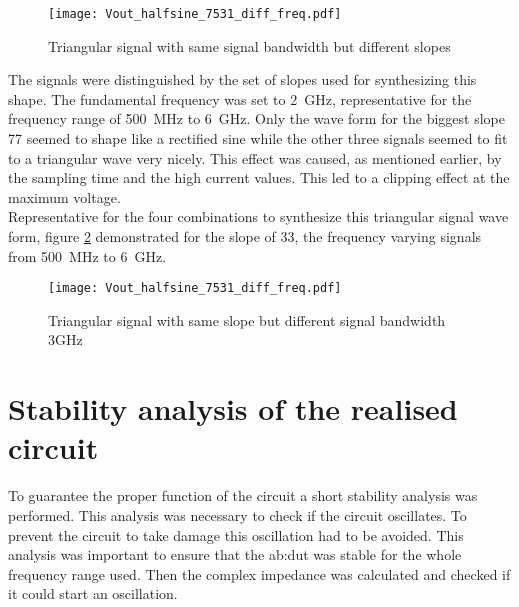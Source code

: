 \begin{figure}[htb!]
	\centering
  \texttt{[image: Vout\_halfsine\_7531\_diff\_freq.pdf]}
	\caption{Triangular signal with same signal bandwidth but different slopes}
	\label{fig:DiffSlopeSameBWTriangular}
\end{figure}

The signals were distinguished by the set of slopes used for synthesizing this shape.
The fundamental frequency was set to \SI{2}{\giga \hertz}, representative for the frequency range of \SI{500}{\mega \hertz} to \SI{6}{\giga \hertz}.
Only the wave form for the biggest slope 77 seemed to shape like a rectified sine while the other three signals seemed to fit to a triangular wave very nicely.
This effect was caused, as mentioned earlier, by the sampling time and the high current values.
This led to a clipping effect at the maximum voltage.\\
Representative for the four combinations to synthesize this triangular signal wave form, 
figure \ref{fig:DiffSigBWSameSlopeTriangular} demonstrated for the slope of 33, the frequency varying signals from \SI{500}{\mega \hertz} to \SI{6}{\giga \hertz}.


\begin{figure}[htb!]
	\centering
  \texttt{[image: Vout\_halfsine\_7531\_diff\_freq.pdf]}
	\caption{Triangular signal with same slope but different signal bandwidth 3GHz}
	\label{fig:DiffSigBWSameSlopeTriangular}
\end{figure}




\section{Stability analysis of the realised circuit}
To guarantee the proper function of the circuit a short stability analysis was performed.
This analysis was necessary to check if the circuit oscillates.
To prevent the circuit to take damage this oscillation had to be avoided.
This analysis was important to ensure that the \gls{ab:dut} was stable for the whole frequency range used.
 Then the complex impedance was calculated and checked if it could start an oscillation.

